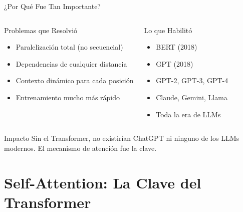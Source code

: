 \documentclass[aspectratio=169]{beamer}
\begin{document}
\begin{frame}{¿Por Qué Fue Tan Importante?}
    \begin{columns}[t]
        \begin{block}{Problemas que Resolvió}
            \begin{itemize}
                \item[\faCheck] Paralelización total (no secuencial)
                \item[\faCheck] Dependencias de cualquier distancia
                \item[\faCheck] Contexto dinámico para cada posición
                \item[\faCheck] Entrenamiento mucho más rápido
            \end{itemize}
        \end{block}
        
        \begin{block}{Lo que Habilitó}
            \begin{itemize}
                \item BERT (2018)
                \item GPT (2018)
                \item GPT-2, GPT-3, GPT-4
                \item Claude, Gemini, Llama
                \item Toda la era de LLMs
            \end{itemize}
        \end{block}
    \end{columns}
    
    \vspace{0.4cm}
    \begin{alertblock}{Impacto}
        Sin el Transformer, no existirían ChatGPT ni ninguno de los LLMs modernos. El mecanismo de atención fue la clave.
    \end{alertblock}
\end{frame}

\section{Self-Attention: La Clave del Transformer}
\end{document}
